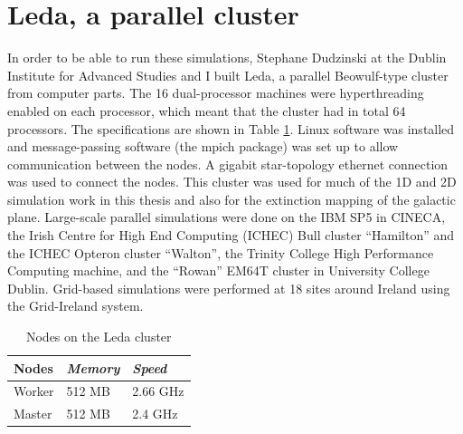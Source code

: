 \section{Leda, a parallel cluster}
In order to be able to run these simulations,
Stephane Dudzinski at the Dublin Institute for Advanced Studies and I built Leda, a parallel Beowulf-type cluster from computer parts.
The 16 dual-processor machines were hyperthreading enabled on each processor, which meant that the cluster had in total 64 processors.
The specifications are shown in Table \ref{tab:leda}.
Linux software was installed and message-passing software (the mpich package) was set up to allow communication between the nodes.
A gigabit star-topology ethernet connection was used to connect the nodes.
This cluster was used for much of the 1D and 2D simulation work in this thesis and also for the extinction mapping of the galactic plane.
Large-scale parallel simulations were done on the IBM SP5 in CINECA, the Irish
Centre for High End Computing (ICHEC)
Bull cluster ``Hamilton'' and the ICHEC Opteron cluster ``Walton'', the Trinity
College High Performance Computing
machine, and the ``Rowan'' EM64T cluster in University College Dublin.
Grid-based simulations were performed at 18 sites around Ireland using the Grid-Ireland system.

\begin{table}
\begin{tabular}{|p{3.5cm}|p{4.5cm}|p{4.5cm}|}
\hline
Nodes & \emph{Memory} & \emph{Speed}
\\
\hline
Worker & 512 MB& 2.66 GHz
\\
\hline
Master & 512 MB& 2.4 GHz
\\
\hline
\end{tabular}
\caption{Nodes on the Leda cluster}
\label{tab:leda}
\end{table}
